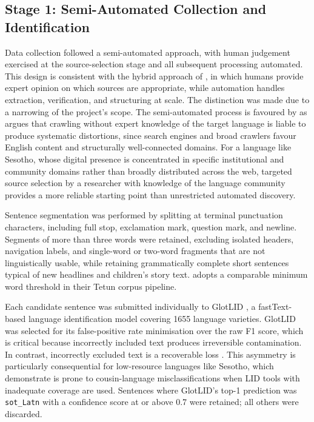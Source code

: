 \documentclass[12pt]{ThesisRU}
\begin{document}
\subsection{Stage 1: Semi-Automated Collection and Identification}
\label{sec:semi-automated}
Data collection followed a semi-automated approach, with human judgement exercised at the source-selection stage and all subsequent processing automated. This design is consistent with the hybrid approach of \citet{gumede2025creating}, in which humans provide expert opinion on which sources are appropriate, while automation handles extraction, verification, and structuring at scale. The distinction was made due to a narrowing of the project's scope. The semi-automated process is favoured by \citet{barbaresi2013challenges} as \citet{barbaresi2013challenges} argues that crawling without expert knowledge of the target language is liable to produce systematic distortions, since search engines and broad crawlers favour English content and structurally well-connected domains. For a language like Sesotho, whose digital presence is concentrated in specific institutional and community domains rather than broadly distributed across the web, targeted source selection by a researcher with knowledge of the language community provides a more reliable starting point than unrestricted automated discovery.

Sentence segmentation was performed by splitting at terminal punctuation characters, including full stop, exclamation mark, question mark, and newline. Segments of more than three words were retained, excluding isolated headers, navigation labels, and single-word or two-word fragments that are not linguistically usable, while retaining grammatically complete short sentences typical of new headlines and children's story text. \citep{de2024data} adopts a comparable minimum word threshold in their Tetun corpus pipeline.

Each candidate sentence was submitted individually to GlotLID \citep{kargaran2024glotcc}, a fastText-based language identification model covering 1655 language varieties. GlotLID was selected for its false-positive rate minimisation over the raw F1 score, which is critical because incorrectly included text produces irreversible contamination. In contrast, incorrectly excluded text is a recoverable loss \citep{kreutzer-etal-2022-quality}. This asymmetry is particularly consequential for low-resource languages like Sesotho, which \citet{kargaran2024glotcc} demonstrate is prone to cousin-language misclassifications when LID tools with inadequate coverage are used. Sentences where GlotLID's top-1 prediction was \texttt{sot\_Latn} with a confidence score at or above 0.7 were retained; all others were discarded.
\end{document}
